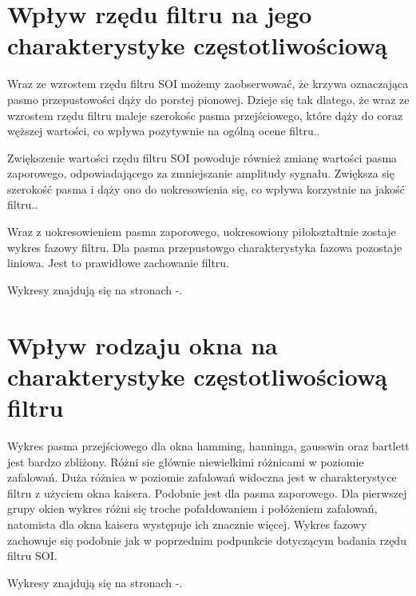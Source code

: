 \documentclass[wide,a4paper,titlepage,12pt]{mwart}
\begin{document}
  
	\section{Wpływ rzędu filtru na jego charakterystyke częstotliwościową}
		Wraz ze wzrostem rzędu filtru SOI możemy zaobserwować, że krzywa oznaczająca pasmo przepustowości dąży do porstej pionowej. Dzieje się tak dlatego, że wraz ze wzrostem rzędu filtru maleje szerokośc pasma przejściowego, które dąży do coraz węższej wartości, co wpływa pozytywnie na ogólną ocene filtru..
		
		
		Zwiększenie wartości rzędu filtru SOI powoduje również zmianę wartości pasma zaporowego, odpowiadającego za zmniejszanie amplitudy sygnału. Zwiększa się szerokość pasma i dąży ono do uokresowienia się, co wpływa korzystnie na jakość filtru..
		
		
		Wraz z uokresowieniem pasma zaporowego, uokresowiony piłokształtnie zostaje wykres fazowy filtru. Dla pasma przepustowgo charakterystyka fazowa pozostaje liniowa. Jest to prawidłowe zachowanie filtru.
		
		Wykresy znajdują się na stronach \pageref{fig1}-\pageref{fig4}.
	
	\section{Wpływ rodzaju okna na charakterystyke częstotliwościową filtru}
	Wykres pasma przejściowego dla okna hamming, hanninga, gausswin oraz bartlett jest bardzo zbliżony. Różni sie głównie niewielkimi różnicami w poziomie zafalowań. Duża różnica w poziomie zafalowań widoczna jest w charakterystyce filtru z użyciem okna kaisera. Podobnie jest dla pasma zaporowego. Dla pierwszej grupy okien wykres różni się troche pofałdowaniem i połóżeniem zafalowań, natomista dla okna kaisera występuje ich znacznie więcej. Wykres fazowy zachowuje się podobnie jak w poprzednim podpunkcie dotyczącym badania rzędu filtru SOI.
	
	Wykresy znajdują się na stronach \pageref{fig5}-\pageref{fig9}.
	
\end{document}
